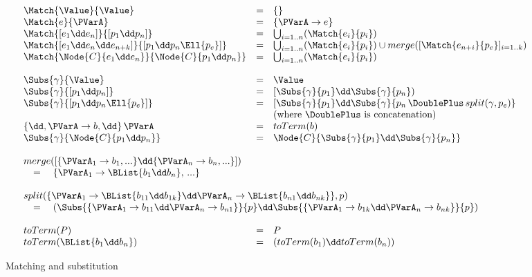 \begin{figure*}[t]
\[\begin{array}{lclll}
\Match{\Value}{\Value} &=& \{\} \\
\Match{e}{\PVarA} &=& \{\PVarA \to e\} \\
\Match{[e_1 \dd e_n]}{[p_1 \dd p_n]} &=&
  \bigcup_{i=1..n} (\Match{e_i}{p_i}) \\
\Match{[e_1 \dd e_n \dd e_{n+k}]}{[p_1 \dd p_n \Ell{p_e}]} &=&
  \bigcup_{i=1..n} (\Match{e_i}{p_i}) \cup
  merge([\Match{e_{n+i}}{p_e}]_{i=1..k}) \\
\Match{\Node{C}{e_1 \dd e_n}}{\Node{C}{p_1 \dd p_n}} &=&
  \bigcup_{i=1..n} (\Match{e_i}{p_i}) \\ \\

\Subs{\gamma}{\Value}        &=& \Value \\
\Subs{\gamma}{[p_1 \dd p_n]}    &=& [\Subs{\gamma}{p_1} \dd \Subs{\gamma}{p_n}) \\
\Subs{\gamma}{[p_1 \dd p_n \Ell{p_e}]} &=&
  [\Subs{\gamma}{p_1} \dd \Subs{\gamma}{p_n\,\DoublePlus\,split(\gamma, p_e)} \\
    &&\text{(where } \DoublePlus \text{ is concatenation)} \\
\{\dd,\PVarA \to b,\dd\}\,\PVarA &=& toTerm(b) \\
\Subs{\gamma}{\Node{C}{p_1 \dd p_n}} &=&
  \Node{C}{\Subs{\gamma}{p_1} \dd \Subs{\gamma}{p_n}} \\ \\

\multicolumn{3}{l}{merge([\{\PVarA_1 \to b_1,...\} \dd \{\PVarA_n \to b_n,...\}])} \\
\multicolumn{3}{l}{\quad=\quad \{\PVarA_1 \to \BList{b_1 \dd b_n},\,...\}} \\ \\

\multicolumn{3}{l}{split(\{\PVarA_1 \to \BList{b_{11} \dd b_{1k}} \dd 
  \PVarA_n \to \BList{b_{n1} \dd b_{nk}}\}, p)} \\
\multicolumn{3}{l}{\quad=\quad
  (\Subs{\{\PVarA_1 \to b_{11} \dd  \PVarA_n \to b_{n1}\}}{p} \dd 
   \Subs{\{\PVarA_1 \to b_{1k} \dd  \PVarA_n \to b_{nk}\}}{p})} \\ \\

toTerm(P) &=& P \\
toTerm(\BList{b_1 \dd b_n}) &=&
  (toTerm(b_1) \dd toTerm(b_n))

\end{array}\]
\caption{Matching and substitution}
\label{fig:formal-subs}
\end{figure*}

